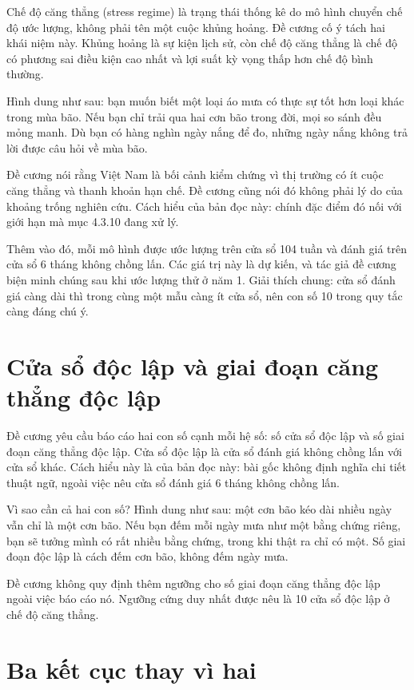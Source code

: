 Chế độ căng thẳng (stress regime) là trạng thái thống kê do mô hình chuyển chế độ ước lượng, không phải tên một cuộc khủng hoảng. Đề cương cố ý tách hai khái niệm này. Khủng hoảng là sự kiện lịch sử, còn chế độ căng thẳng là chế độ có phương sai điều kiện cao nhất và lợi suất kỳ vọng thấp hơn chế độ bình thường.

Hình dung như sau: bạn muốn biết một loại áo mưa có thực sự tốt hơn loại khác trong mùa bão. Nếu bạn chỉ trải qua hai cơn bão trong đời, mọi so sánh đều mỏng manh. Dù bạn có hàng nghìn ngày nắng để đo, những ngày nắng không trả lời được câu hỏi về mùa bão.

Đề cương nói rằng Việt Nam là bối cảnh kiểm chứng vì thị trường có ít cuộc căng thẳng và thanh khoản hạn chế. Đề cương cũng nói đó không phải lý do của khoảng trống nghiên cứu. Cách hiểu của bản đọc này: chính đặc điểm đó nối với giới hạn mà mục 4.3.10 đang xử lý.

Thêm vào đó, mỗi mô hình được ước lượng trên cửa sổ 104 tuần và đánh giá trên cửa sổ 6 tháng không chồng lấn. Các giá trị này là dự kiến, và tác giả đề cương biện minh chúng sau khi ước lượng thử ở năm 1. Giải thích chung: cửa sổ đánh giá càng dài thì trong cùng một mẫu càng ít cửa sổ, nên con số 10 trong quy tắc càng đáng chú ý.

\section{Cửa sổ độc lập và giai đoạn căng thẳng độc lập}

Đề cương yêu cầu báo cáo hai con số cạnh mỗi hệ số: số cửa sổ độc lập và số giai đoạn căng thẳng độc lập. Cửa sổ độc lập là cửa sổ đánh giá không chồng lấn với cửa sổ khác. Cách hiểu này là của bản đọc này: bài gốc không định nghĩa chi tiết thuật ngữ, ngoài việc nêu cửa sổ đánh giá 6 tháng không chồng lấn.

Vì sao cần cả hai con số? Hình dung như sau: một cơn bão kéo dài nhiều ngày vẫn chỉ là một cơn bão. Nếu bạn đếm mỗi ngày mưa như một bằng chứng riêng, bạn sẽ tưởng mình có rất nhiều bằng chứng, trong khi thật ra chỉ có một. Số giai đoạn độc lập là cách đếm cơn bão, không đếm ngày mưa.

Đề cương không quy định thêm ngưỡng cho số giai đoạn căng thẳng độc lập ngoài việc báo cáo nó. Ngưỡng cứng duy nhất được nêu là 10 cửa sổ độc lập ở chế độ căng thẳng.

\section{Ba kết cục thay vì hai}

